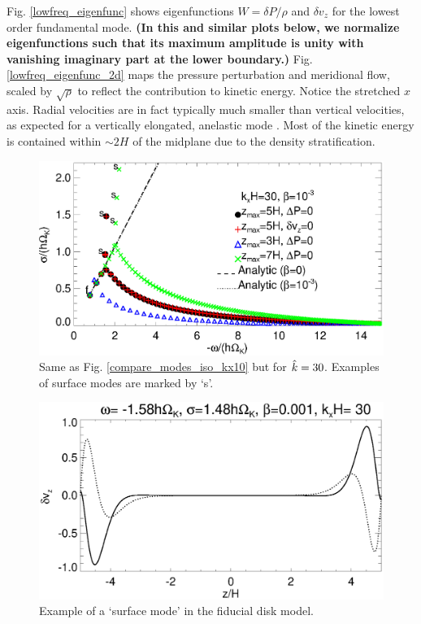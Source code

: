 Fig. \ref{lowfreq_eigenfunc} shows 
eigenfunctions $W = \delta P/\rho$ and $\delta   v_z$ for the lowest
order fundamental mode.  {\bf (In this and similar plots below, we
  normalize eigenfunctions such that its maximum amplitude is unity
  with vanishing imaginary part at the lower boundary.)} 
Fig. \ref{lowfreq_eigenfunc_2d} maps the pressure perturbation and meridional flow,
scaled by $\sqrt{\rho}$ to reflect the contribution to kinetic
energy. Notice the stretched $x$ axis. Radial velocities are in fact typically much 
smaller than vertical velocities, as expected for a vertically
elongated, anelastic mode . Most of the kinetic
energy is contained within $\sim 2H$ of the midplane due to the
density stratification.  

\begin{figure}
  \includegraphics[width=\linewidth]{figures/compare_modes_iso_kx30_analytic.ps}
  \caption{Same as Fig. \ref{compare_modes_iso_kx10} but for
    $\hat{k}=30$. Examples of surface modes are 
    marked by `s'. \label{compare_modes_iso_kx30}
  }
\end{figure}


\begin{figure}
  \includegraphics[width=\linewidth,clip=true,trim=0cm 0cm 0cm
  0cm]{figures/eigenvectorvz_iso_surf}
  \caption{Example of a `surface mode' in the fiducial disk model.
    \label{lowfreq_eigenfunc_surf}
  }
\end{figure}

